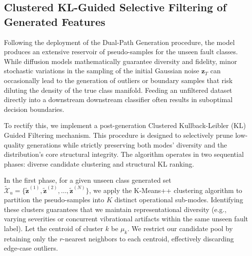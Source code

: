 \subsection{Clustered KL-Guided Selective Filtering of Generated Features}
\label{subsec:kl_filter}
Following the deployment of the Dual-Path Generation procedure, the model produces an extensive reservoir of pseudo-samples for the unseen fault classes. While diffusion models mathematically guarantee diversity and fidelity, minor stochastic variations in the sampling of the initial Gaussian noise $\mathbf{z}_T$ can occasionally lead to the generation of outliers or boundary samples that risk diluting the density of the true class manifold. Feeding an unfiltered dataset directly into a downstream downstream classifier often results in suboptimal decision boundaries. 

To rectify this, we implement a post-generation Clustered Kullback-Leibler (KL) Guided Filtering mechanism. This procedure is designed to selectively prune low-quality generations while strictly preserving both modes' diversity and the distribution's core structural integrity. The algorithm operates in two sequential phases: diverse candidate clustering and structural KL ranking.

In the first phase, for a given unseen class generated set $\widetilde{\mathcal{X}}_u = \{\tilde{\mathbf{z}}^{(1)}, \tilde{\mathbf{z}}^{(2)}, \dots, \tilde{\mathbf{z}}^{(N)}\}$, we apply the K-Means++ clustering algorithm to partition the pseudo-samples into $K$ distinct operational sub-modes. Identifying these clusters guarantees that we maintain representational diversity (e.g., varying severities or concurrent vibrational artifacts within the same unseen fault label). Let the centroid of cluster $k$ be $\mu_k$. We restrict our candidate pool by retaining only the $r$-nearest neighbors to each centroid, effectively discarding edge-case outliers.

